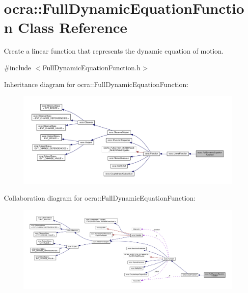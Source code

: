 \hypertarget{classocra_1_1FullDynamicEquationFunction}{}\section{ocra\+:\+:Full\+Dynamic\+Equation\+Function Class Reference}
\label{classocra_1_1FullDynamicEquationFunction}


Create a linear function that represents the dynamic equation of motion.  




{\ttfamily \#include $<$Full\+Dynamic\+Equation\+Function.\+h$>$}



Inheritance diagram for ocra\+:\+:Full\+Dynamic\+Equation\+Function\+:
\nopagebreak
\begin{figure}[H]
\begin{center}
\leavevmode
\includegraphics[width=350pt]{da/d36/classocra_1_1FullDynamicEquationFunction__inherit__graph}
\end{center}
\end{figure}


Collaboration diagram for ocra\+:\+:Full\+Dynamic\+Equation\+Function\+:
\nopagebreak
\begin{figure}[H]
\begin{center}
\leavevmode
\includegraphics[width=350pt]{d3/d0e/classocra_1_1FullDynamicEquationFunction__coll__graph}
\end{center}
\end{figure}
